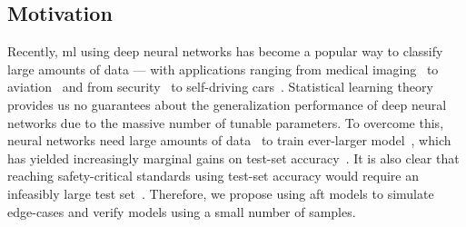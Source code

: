 \documentclass[conference]{IEEEtran}
\begin{document}
\subsection{Motivation}

Recently, \acrfull{ml} using deep neural networks has become a popular way to classify large amounts of data --- with applications ranging from medical imaging~\cite{ai_medical_imaging} to aviation~\cite{ai_aviation} and from security~\cite{ai_security,ai_luggage,ai_prison} to self-driving cars~\cite{ai_automotive}.
Statistical learning theory~\cite{vcdimension} provides us no guarantees about the generalization performance of deep neural networks due to the massive number of tunable parameters. 
To overcome this, neural networks need large amounts of data~\cite{desislavov2021compute,bailly2022effects} to train ever-larger model~\cite{desislavov2021compute}, which has yielded increasingly marginal gains on test-set accuracy~\cite{sun2017revisiting}.
It is also clear that reaching safety-critical standards using test-set accuracy would require an infeasibly large test set~\cite{meyers}. 
Therefore, we propose using \acrfull{aft} models to simulate edge-cases and verify models using a small number of samples.
\end{document}

